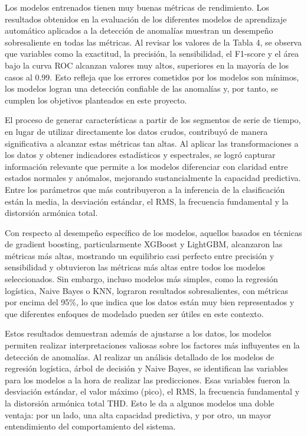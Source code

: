 \documentclass[11pt,a4paper,spanish]{book}
\numberwithin{equation}{chapter}
\numberwithin{figure}{chapter}
\begin{document}
Los modelos entrenados tienen muy buenas métricas de rendimiento. 
Los resultados obtenidos en la evaluación de los diferentes modelos de aprendizaje 
automático aplicados a la detección de anomalías muestran un desempeño sobresaliente 
en todas las métricas. 
Al revisar los valores de la Tabla 4, se observa que variables como la exactitud, 
la precisión, la sensibilidad, el F1-score y el área bajo la curva ROC alcanzan 
valores muy altos, superiores en la mayoría de los casos al 0.99. Esto refleja que los 
errores cometidos por los modelos son mínimos, los modelos logran una detección 
confiable de las anomalías y, por tanto, se cumplen los objetivos planteados en 
este proyecto.


El proceso de generar características a partir de los segmentos de serie de tiempo, 
en lugar de utilizar directamente los datos crudos, contribuyó de manera significativa 
a alcanzar estas métricas tan altas. Al aplicar las transformaciones a los datos y 
obtener indicadores estadísticos y espectrales, se logró capturar información relevante 
que permite a los modelos diferenciar con claridad entre estados normales y anómalos, 
mejorando sustancialmente la capacidad predictiva. Entre los parámetros que más 
contribuyeron a la inferencia de la clasificación están la media, la desviación estándar, 
el RMS, la frecuencia fundamental y la distorsión armónica total.


Con respecto al desempeño específico de los modelos, aquellos basados en técnicas de 
gradient boosting, particularmente XGBoost y LightGBM, alcanzaron las métricas más altas, 
mostrando un equilibrio casi perfecto entre precisión y sensibilidad y obtuvieron las 
métricas más altas entre todos los modelos seleccionados. Sin embargo, incluso modelos 
más simples, como la regresión logística, Naive Bayes o KNN, lograron resultados 
sobresalientes, con métricas por encima del 95\%, lo que indica que los datos están muy 
bien representados y que diferentes enfoques de modelado pueden ser útiles en este 
contexto.


Estos resultados demuestran además de ajustarse a los datos, los modelos permiten 
realizar interpretaciones valiosas sobre los factores más influyentes en la detección 
de anomalías. 
Al realizar un análisis detallado de los modelos de regresión logística, árbol de 
decisión y Naive Bayes, se identifican las variables para los modelos a la hora de 
realizar las predicciones. Esas variables fueron la desviación estándar, el valor 
máximo (pico), el RMS, la frecuencia fundamental y la distorsión armónica total THD. 
Esto le da a algunos modelos una doble ventaja: por un lado, una alta capacidad 
predictiva, y por otro, un mayor entendimiento del comportamiento del sistema.
\end{document}
